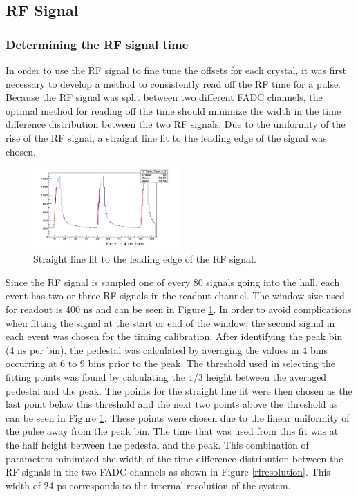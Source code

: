 \documentclass[twoside]{article}
\begin{document}
\begin{multicols}{2}
\subsection{RF Signal}
\subsubsection{Determining the RF signal time}
	In order to use the RF signal to fine tune the offsets for each crystal, it was first necessary to develop a method to consistently read off the RF time for a pulse. Because the RF signal was split between two different FADC channels, the optimal method for reading off the time should minimize the width in the time difference distribution between the two RF signals. Due to the uniformity of the rise of the RF signal, a straight line fit to the leading edge of the signal was chosen.\\
\begin{figure}[H]
  \centering
      \includegraphics[width=0.5\textwidth]{rfFitting.png}
  \caption{Straight line fit to the leading edge of the RF signal.}
  \label{rfsignal}
\end{figure}	
Since the RF signal is sampled one of every 80 signals going into the hall, each event has two or three RF signals in the readout channel. The window size used for readout is 400 ns and can be seen in Figure \ref{rfsignal}. In order to avoid complications when fitting the signal at the start or end of the window, the second signal in each event was chosen for the timing calibration. After identifying the peak bin (4 ns per bin), the pedestal was calculated by averaging the values in 4 bins occurring at 6 to 9 bins prior to the peak. The threshold used in selecting the fitting points was found by calculating the $1/3$ height between the averaged pedestal and the peak. The points for the straight line fit were then chosen as the last point below this threshold and the next two points above the threshold as can be seen in Figure \ref{rfsignal}. These points were chosen due to the linear uniformity of the pulse away from the peak bin. The time that was used from this fit was at the half height between the pedestal and the peak. This combination of parameters minimized the width of the time difference distribution between the RF signals in the two FADC channels as shown in Figure \ref{rfresolution}. This width of 24 ps corresponds to the internal resolution of the system.\\ 

\end{multicols}
\end{document}
